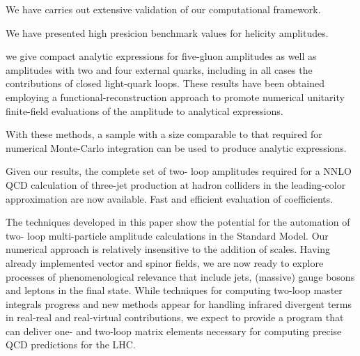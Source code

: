 



We have carries out extensive validation of our computational framework.

We have presented high presicion benchmark values for helicity amplitudes.

 we give compact
analytic expressions for five-gluon amplitudes as well as amplitudes with two and four
external quarks, including in all cases the contributions of closed light-quark loops.
These
results have been obtained employing a functional-reconstruction approach to promote
numerical unitarity  finite-field evaluations of the amplitude to analytical expressions.

With these methods, a sample with a size comparable to that required for
numerical Monte-Carlo integration
can be used to produce analytic expressions.

 Given our results, the complete set of two-
 loop amplitudes required for a NNLO QCD calculation of three-jet production at hadron
 colliders in the leading-color approximation are now available.
 Fast and efficient evaluation of coefficients.


 The techniques developed in this paper show the potential for the automation of two-
 loop multi-particle amplitude calculations in the Standard Model. Our numerical approach
 is relatively insensitive to the addition of scales. Having already implemented vector and
 spinor fields, we are now ready to explore processes of phenomenological relevance that
 include jets, (massive) gauge bosons and leptons in the final state. While techniques for
 computing two-loop master integrals progress and new methods appear for handling infrared
 divergent terms in real-real and real-virtual contributions, we expect to provide a program
 that can deliver one- and two-loop matrix elements necessary for computing precise QCD
 predictions for the LHC.



